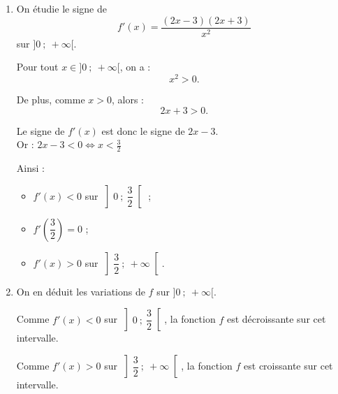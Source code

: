\documentclass[10pt]{article}
\begin{document}
\begin{enumerate}
\begin{enumerate}
Ainsi :
$$
f=\frac{u}{v}.
$$

Les fonctions $u$ et $v$ sont dérivables sur $]0\ ;\ +\infty[$, et, pour tout $x\in]0\ ;\ +\infty[$ :
$$
u'(x)=8x+7
\qquad \text{et} \qquad
v'(x)=1.
$$

De plus, pour tout $x\in]0\ ;\ +\infty[$, on a $v(x)=x\neq 0$.

On peut donc appliquer la formule de dérivation d’un quotient :
$$
\left(\frac{u}{v}\right)'=\frac{u'v-uv'}{v^2}.
$$

Ainsi, pour tout $x\in]0\ ;\ +\infty[$ :
\begin{align*}
	f'(x)
	&=\frac{u'(x)v(x)-u(x)v'(x)}{\left(v(x)\right)^2}\\
	&=\frac{(8x+7)\times x-(4x^2+7x+9)\times 1}{x^2}\\
	&=\frac{8x^2+7x-4x^2-7x-9}{x^2}\\
	&=\frac{4x^2-9}{x^2}\\
	&=\frac{(2x-3)(2x+3)}{x^2}.
\end{align*}

Donc, pour tout $x\in]0\ ;\ +\infty[$,
$$
f'(x)=\frac{(2x-3)(2x+3)}{x^2}.
$$


\item On étudie le signe de
$$
f'(x)=\frac{(2x-3)(2x+3)}{x^2}
$$
sur $]0\ ;\ +\infty[$.

Pour tout $x\in]0\ ;\ +\infty[$, on a :
\[
x^2>0.
\]

De plus, comme $x>0$, alors :
\[
2x+3>0.
\]

Le signe de $f'(x)$ est donc le signe de $2x-3$.\\
Or :
$
2x-3<0 \iff x<\frac{3}{2}$



Ainsi :
\begin{itemize}[left=5mm,label={\textbullet~~}]
\item $f'(x)<0$ sur $\left]0\ ;\ \dfrac{3}{2}\right[$ ;
\item $f'\left(\dfrac{3}{2}\right)=0$ ;
\item $f'(x)>0$ sur $\left]\dfrac{3}{2}\ ;\ +\infty\right[$.
\end{itemize}

\item On en déduit les variations de $f$ sur $]0\ ;\ +\infty[$.

Comme $f'(x)<0$ sur $\left]0\ ;\ \dfrac{3}{2}\right[$, la fonction $f$ est décroissante sur cet intervalle.

Comme $f'(x)>0$ sur $\left]\dfrac{3}{2}\ ;\ +\infty\right[$, la fonction $f$ est croissante sur cet intervalle.


\end{enumerate}
\end{enumerate}
\end{document}

